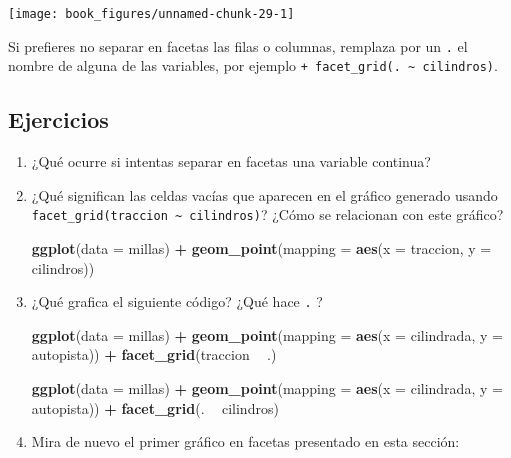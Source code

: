 \documentclass[11pt,oneside]{report}
\newenvironment{Shaded}{\begin{snugshade}}{\end{snugshade}}
\newcommand{\DataTypeTok}[1]{\textcolor[rgb]{0.13,0.29,0.53}{#1}}
\newcommand{\KeywordTok}[1]{\textcolor[rgb]{0.13,0.29,0.53}{\textbf{#1}}}
\newcommand{\NormalTok}[1]{#1}
\newcommand{\OperatorTok}[1]{\textcolor[rgb]{0.81,0.36,0.00}{\textbf{#1}}}
\newcommand{\StringTok}[1]{\textcolor[rgb]{0.31,0.60,0.02}{#1}}
\begin{document}
\begin{center}\texttt{[image: book\_figures/unnamed-chunk-29-1]} \end{center}

Si prefieres no separar en facetas las filas o columnas, remplaza por un
\texttt{.} el nombre de alguna de las variables, por ejemplo
\texttt{+\ facet\_grid(.\ \textasciitilde{}\ cilindros)}.

\hypertarget{ejercicios-2}{%
\subsection{Ejercicios}\label{ejercicios-2}}

\begin{enumerate}
\def\labelenumi{\arabic{enumi}.}
\item
  ¿Qué ocurre si intentas separar en facetas una variable continua?
\item
  ¿Qué significan las celdas vacías que aparecen en el gráfico generado
  usando \texttt{facet\_grid(traccion\ \textasciitilde{}\ cilindros)}?
  ¿Cómo se relacionan con este gráfico?

\begin{Shaded}
\begin{Highlighting}[]
\KeywordTok{ggplot}\NormalTok{(}\DataTypeTok{data =}\NormalTok{ millas) }\OperatorTok{+}
\StringTok{  }\KeywordTok{geom_point}\NormalTok{(}\DataTypeTok{mapping =} \KeywordTok{aes}\NormalTok{(}\DataTypeTok{x =}\NormalTok{ traccion, }\DataTypeTok{y =}\NormalTok{ cilindros))}
\end{Highlighting}
\end{Shaded}
\item
  ¿Qué grafica el siguiente código? ¿Qué hace \texttt{.} ?

\begin{Shaded}
\begin{Highlighting}[]
\KeywordTok{ggplot}\NormalTok{(}\DataTypeTok{data =}\NormalTok{ millas) }\OperatorTok{+}
\StringTok{  }\KeywordTok{geom_point}\NormalTok{(}\DataTypeTok{mapping =} \KeywordTok{aes}\NormalTok{(}\DataTypeTok{x =}\NormalTok{ cilindrada, }\DataTypeTok{y =}\NormalTok{ autopista)) }\OperatorTok{+}
\StringTok{  }\KeywordTok{facet_grid}\NormalTok{(traccion }\OperatorTok{~}\StringTok{ }\NormalTok{.)}

\KeywordTok{ggplot}\NormalTok{(}\DataTypeTok{data =}\NormalTok{ millas) }\OperatorTok{+}
\StringTok{  }\KeywordTok{geom_point}\NormalTok{(}\DataTypeTok{mapping =} \KeywordTok{aes}\NormalTok{(}\DataTypeTok{x =}\NormalTok{ cilindrada, }\DataTypeTok{y =}\NormalTok{ autopista)) }\OperatorTok{+}
\StringTok{  }\KeywordTok{facet_grid}\NormalTok{(. }\OperatorTok{~}\StringTok{ }\NormalTok{cilindros)}
\end{Highlighting}
\end{Shaded}
\item
  Mira de nuevo el primer gráfico en facetas presentado en esta sección:


\end{enumerate}
\end{document}
